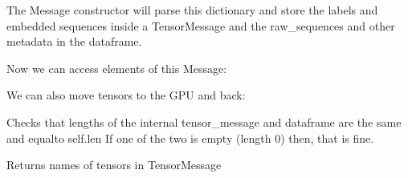 \documentclass[letterpaper,10pt,english]{sphinxmanual}
\begin{document}
\begin{fulllineitems}
The Message constructor will parse this dictionary and store the labels and embedded sequences inside a TensorMessage and the raw\_sequences and other metadata in the dataframe.

Now we can access elements of this Message:

%
\begin{sphinxVerbatim}[commandchars=\\\{\}]
\PYG{p}{[}\PYG{p}{]}
\PYG{p}{[}\PYG{p}{]}
\PYG{p}{[}\PYG{p}{]}
\end{sphinxVerbatim}

We can also move tensors to the GPU and back:

%
\begin{sphinxVerbatim}[commandchars=\\\{\}]
 
\PYG{p}{[}\PYG{p}{]} 
\end{sphinxVerbatim}

\begin{fulllineitems}
\label{\detokenize{Fireworks:Fireworks.core.message.Message.check_length}}
Checks that lengths of the internal tensor\_message and dataframe are the same and equalto self.len
If one of the two is empty (length 0) then, that is fine.

\end{fulllineitems}


\begin{fulllineitems}
\label{\detokenize{Fireworks:Fireworks.core.message.Message.columns}}
Returns names of tensors in TensorMessage


\end{fulllineitems}
\end{fulllineitems}
\end{document}
